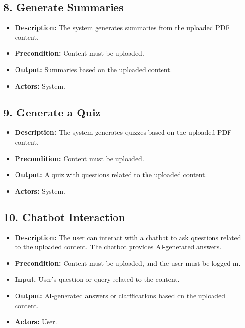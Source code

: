 \documentclass[a4paper,12pt]{article}
\begin{document}
\subsection*{8. Generate Summaries}
\begin{itemize}[left=0pt]
    \item \textbf{Description:} The system generates summaries from the uploaded PDF content.
    \item \textbf{Precondition:} Content must be uploaded.
    \item \textbf{Output:} Summaries based on the uploaded content.
    \item \textbf{Actors:} System.
\end{itemize}

\subsection*{9. Generate a Quiz}
\begin{itemize}[left=0pt]
    \item \textbf{Description:} The system generates quizzes based on the uploaded PDF content.
    \item \textbf{Precondition:} Content must be uploaded.
    \item \textbf{Output:} A quiz with questions related to the uploaded content.
    \item \textbf{Actors:} System.
\end{itemize}

\subsection*{10. Chatbot Interaction}
\begin{itemize}[left=0pt]
    \item \textbf{Description:} The user can interact with a chatbot to ask questions related to the uploaded content. The chatbot provides AI-generated answers.
    \item \textbf{Precondition:} Content must be uploaded, and the user must be logged in.
    \item \textbf{Input:} User's question or query related to the content.
    \item \textbf{Output:} AI-generated answers or clarifications based on the uploaded content.
    \item \textbf{Actors:} User.
\end{itemize}
\end{document}
